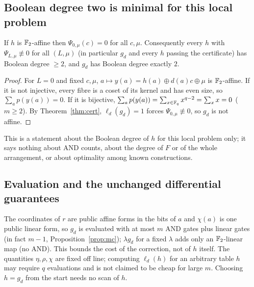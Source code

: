 \subsection{Boolean degree two is minimal for this local problem}\label{ss:deg}
\begin{proposition}\label{prop:affine}
If $h$ is $\mathbb{F}_2$-affine then $\Psi_{0,\mu}(c)=0$ for all $c,\mu$. Consequently every $h$ with
$\Psi_{L,\mu}\not\equiv0$ for all $(L,\mu)$ (in particular $g_d$ and every $h$ passing the certificate) has Boolean
degree $\ge2$, and $g_d$ has Boolean degree exactly $2$.
\end{proposition}
\begin{proof}
For $L=0$ and fixed $c,\mu$, $a\mapsto y(a)=h(a)\oplus d(a)c\oplus\mu$ is $\mathbb{F}_2$-affine. If it is not injective, every
fibre is a coset of its kernel and has even size, so $\sum_ap(y(a))=0$. If it is bijective,
$\sum_ap(y(a))=\sum_{x\in\mathbb{F}_q}x^{q-2}=\sum_{x}x=0$ ($m\ge2$). By Theorem~\ref{thm:cert}, $\ell_d(g_d)=1$ forces
$\Psi_{0,\mu}\not\equiv0$, so $g_d$ is not affine.
\end{proof}
This is a statement about the Boolean degree of $h$ for this local problem only; it says nothing about AND
counts, about the degree of $F$ or of the whole arrangement, or about optimality among known constructions.

\subsection{Evaluation and the unchanged differential guarantees}
\begin{remark}\label{rem:cost}
The coordinates of $r$ are public affine forms in the bits of $a$ and $\chi(a)$ is one public linear form, so $g_d$
is evaluated with at most $m$ AND gates plus linear gates (in fact $m-1$, Proposition~\ref{prop:mc}); $\lambda g_d$ for a
fixed $\lambda$ adds only an $\mathbb{F}_2$-linear map (no AND). This bounds the cost of the correction, not of $h$ itself. The quantities
$\eta,\rho,\chi$ are fixed off line; computing $\ell_d(h)$ for an arbitrary table $h$ may require $q$ evaluations
and is not claimed to be cheap for large $m$. Choosing $h=g_d$ from the start needs no scan of $h$.
\end{remark}

